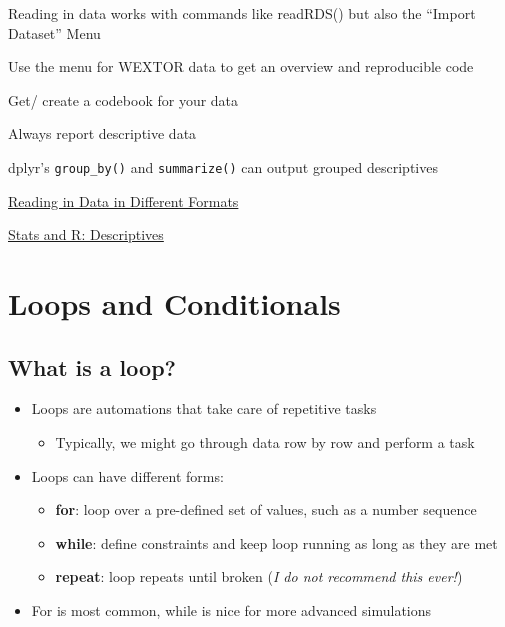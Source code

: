 \documentclass[
]{book}
\providecommand{\tightlist}{%
  \setlength{\itemsep}{0pt}\setlength{\parskip}{0pt}}
\begin{document}
Reading in data works with commands like readRDS() but also the ``Import Dataset'' Menu

Use the menu for WEXTOR data to get an overview and reproducible code

Get/ create a codebook for your data

Always report descriptive data

dplyr's \texttt{group\_by()} and \texttt{summarize()} can output grouped descriptives

\href{https://www.datafiles.samhsa.gov/get-help/format-specific-issues/how-do-i-read-data-r}{Reading in Data in Different Formats}

\href{https://statsandr.com/blog/descriptive-statistics-in-r/}{Stats and R: Descriptives}

\chapter{Loops and Conditionals}\label{loops-and-conditionals}

\section{What is a loop?}\label{what-is-a-loop}

\begin{itemize}
\tightlist
\item
  Loops are automations that take care of repetitive tasks

  \begin{itemize}
  \tightlist
  \item
    Typically, we might go through data row by row and perform a task
  \end{itemize}
\item
  Loops can have different forms:

  \begin{itemize}
  \tightlist
  \item
    \textbf{for}: loop over a pre-defined set of values, such as a number sequence
  \item
    \textbf{while}: define constraints and keep loop running as long as they are met
  \item
    \textbf{repeat}: loop repeats until broken (\emph{I do not recommend this ever!})
  \end{itemize}
\item
  For is most common, while is nice for more advanced simulations
\end{itemize}
\end{document}
